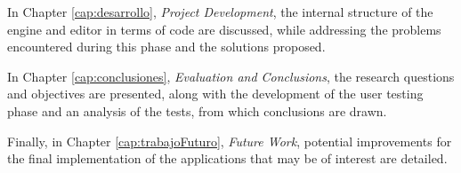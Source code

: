 \medskip

In Chapter \ref{cap:desarrollo}, \textit{Project Development}, the internal structure of the engine and editor in terms of code are discussed, while addressing the problems encountered during this phase and the solutions proposed.

\medskip

In Chapter \ref{cap:conclusiones}, \textit{Evaluation and Conclusions}, the research questions and objectives are presented, along with the development of the user testing phase and an analysis of the tests, from which conclusions are drawn.

\medskip

Finally, in Chapter \ref{cap:trabajoFuturo}, \textit{Future Work}, potential improvements for the final implementation of the applications that may be of interest are detailed.









